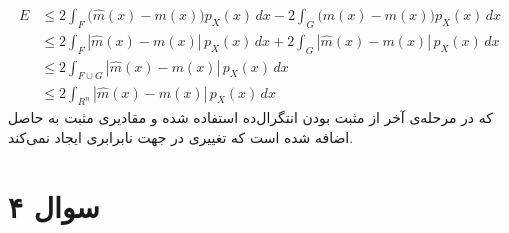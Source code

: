 \documentclass[a4paper, 12pt]{article}
\begin{document}
\begin{enumerate}[A)]
	\[
	\begin{aligned}
		E &\le 2 \int_F \big(\hat{m}(x)-m(x)\big)p_X(x)\,dx - 2 \int_G \big(\hat{m}(x)-m(x)\big)p_X(x)\,dx \\[0.7em]
		& \le 2 \int_F |\hat{m}(x) - m(x)|\,p_X(x)\,dx + 2 \int_G |\hat{m}(x) - m(x)|\,p_X(x)\,dx \\[0.7em]
		& \le 2 \int_{F\cup G} |\hat{m}(x) - m(x)|\,p_X(x)\,dx \\[0.7em]
		& \le 2 \int_{R^n} |\hat{m}(x) - m(x)|\,p_X(x)\,dx
	\end{aligned}
	\]
	که در مرحله‌ی آخر از مثبت بودن انتگرال‌ده استفاده شده و مقادیری مثبت به حاصل اضافه شده است که تغییری در جهت نابرابری ایجاد نمی‌کند.
\end{enumerate}
\pagebreak
\section*{سوال ۴}
\end{document}
